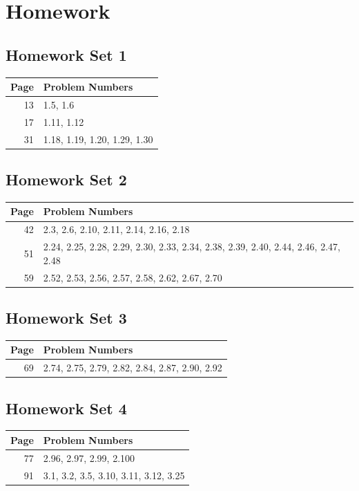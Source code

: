 \documentclass{book}
\begin{document}
\appendix
\chapter{Homework}
\section{Homework Set 1}
\begin{tabular}{r|l}
Page & Problem Numbers\\
\hline
13 & 1.5, 1.6\\
17 & 1.11, 1.12\\
31 & 1.18, 1.19, 1.20, 1.29, 1.30\\
\end{tabular}

\section{Homework Set 2}
\begin{tabular}{r|l}
Page & Problem Numbers\\
\hline
42 & 2.3, 2.6, 2.10, 2.11, 2.14, 2.16, 2.18\\
51 & 2.24, 2.25, 2.28, 2.29, 2.30, 2.33, 2.34, 2.38, 2.39, 2.40, 2.44, 2.46, 2.47, 2.48\\
59 & 2.52, 2.53, 2.56, 2.57, 2.58, 2.62, 2.67, 2.70\\
\end{tabular}

\section{Homework Set 3}
\begin{tabular}{r|l}
Page & Problem Numbers\\
\hline
69 & 2.74, 2.75, 2.79, 2.82, 2.84, 2.87, 2.90, 2.92\\
\end{tabular}

\section{Homework Set 4}
\begin{tabular}{r|l}
Page & Problem Numbers\\
\hline
77 & 2.96, 2.97, 2.99, 2.100\\
91 & 3.1, 3.2, 3.5, 3.10, 3.11, 3.12, 3.25\\
\end{tabular}
\end{document}

